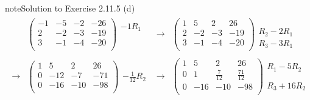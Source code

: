 \documentclass[letterpaper,10pt,english]{jupyterBook}
\begin{document}
\begin{sphinxadmonition}{note}{Solution to Exercise 2.11.5}
\sphinxAtStartPar
(d)
\begin{equation*}
\begin{split} \begin{align*} 
    & \left( \begin{array}{ccc|c} 
         -1 & -5 & -2 & -26 \\ 
         2 & -2 & -3 & -19 \\ 
         3 & -1 & -4 & -20 \\ 
    \end{array} \right) 
    \begin{array}{l} -1 R_{1}\\ \phantom{x} \\ \phantom{x} \end{array} & 
    \longrightarrow 
    & \left( \begin{array}{ccc|c} 
         1 & 5 & 2 & 26 \\ 
         2 & -2 & -3 & -19 \\ 
         3 & -1 & -4 & -20 \\ 
    \end{array} \right) 
    \begin{array}{l} \phantom{x} \\ R_{2} - 2 R_{1} \\ R_{3} - 3 R_{1} \end{array} \\ \\ 
    \longrightarrow 
    & \left( \begin{array}{ccc|c} 
         1 & 5 & 2 & 26 \\ 
         0 & -12 & -7 & -71 \\ 
         0 & -16 & -10 & -98 \\ 
    \end{array} \right) 
    \begin{array}{l} \phantom{x} \\ - \frac{1}{12} R_{2}\\ \phantom{x} \end{array} & 
    \longrightarrow 
    & \left( \begin{array}{ccc|c} 
         1 & 5 & 2 & 26 \\ 
         0 & 1 & \frac{7}{12} & \frac{71}{12} \\ 
         0 & -16 & -10 & -98 \\ 
    \end{array} \right) 
    \begin{array}{l} R_{1} - 5 R_{2} \\ \phantom{x} \\ R_{3} + 16 R_{2}\end{array} \\ \\ 

\end{align*}
\end{split}
\end{equation*}
\end{sphinxadmonition}
\end{document}
